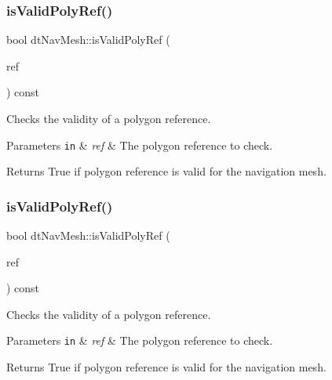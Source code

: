 \subsubsection{\texorpdfstring{is\+Valid\+Poly\+Ref()}{isValidPolyRef()}\hspace{0.1cm}{\footnotesize\ttfamily [1/2]}}
{\footnotesize\ttfamily bool dt\+Nav\+Mesh\+::is\+Valid\+Poly\+Ref (\begin{DoxyParamCaption}\item[{\hyperlink{group__detour_gab4e0b2257a670c1a800057999612b466}{dt\+Poly\+Ref}}]{ref }\end{DoxyParamCaption}) const}

Checks the validity of a polygon reference. 
\begin{DoxyParams}[1]{Parameters}
\mbox{\tt in}  & {\em ref} & The polygon reference to check. \\
\hline
\end{DoxyParams}
\begin{DoxyReturn}{Returns}
True if polygon reference is valid for the navigation mesh. 
\end{DoxyReturn}
\mbox{\label{classdtNavMesh_a84ce3e44a2a97c5377b3b308825fcd37}} 
\subsubsection{\texorpdfstring{is\+Valid\+Poly\+Ref()}{isValidPolyRef()}\hspace{0.1cm}{\footnotesize\ttfamily [2/2]}}
{\footnotesize\ttfamily bool dt\+Nav\+Mesh\+::is\+Valid\+Poly\+Ref (\begin{DoxyParamCaption}\item[{\hyperlink{group__detour_gab4e0b2257a670c1a800057999612b466}{dt\+Poly\+Ref}}]{ref }\end{DoxyParamCaption}) const}

Checks the validity of a polygon reference. 
\begin{DoxyParams}[1]{Parameters}
\mbox{\tt in}  & {\em ref} & The polygon reference to check. \\
\hline
\end{DoxyParams}
\begin{DoxyReturn}{Returns}
True if polygon reference is valid for the navigation mesh. 
\end{DoxyReturn}
\mbox{\label{classdtNavMesh_a5ca09946d00f1cee4987ed5e2f999fdb}} 
